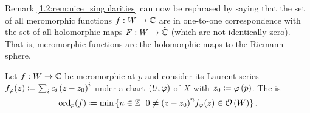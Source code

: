 \documentclass[../Moduli_Spaces_of_Riemann_Surfaces.tex]{subfiles}
\begin{document}
    \begin{remark}
        Remark \ref{1.2:rem:nice_singularities} can now be rephrased by saying that the set of all meromorphic functions $f:W\to\mathbb{C}$ are in one-to-one correspondence with the set of all holomorphic maps $F:W\to\hat{\mathbb{C}}$ (which are not identically zero). That is, meromorphic functions are the holomorphic maps to the Riemann sphere.\exqed
    \end{remark}
    \begin{definition}\label{1.2:def:order}
        Let $f:W\to\mathbb{C}$ be meromorphic at $p$ and consider its Laurent series $f_\varphi\!\left(z\right)\coloneqq\sum_{i}c_i\left(z-z_0\right)^i$ under a chart $\left(U,\varphi\right)$ of $X$ with $z_0\coloneqq\varphi\left(p\right)$. The  is
        \begin{equation*}
            \operatorname{ord}_p\!\left(f\right)\coloneqq\operatorname{min}\left\{n\in\mathbb{Z}\,\middle\vert\,0\neq\left(z-z_0\right)^n\!f_\varphi\!\left(z\right)\in\mathcal{O}\left(W\right)\right\}.
        \end{equation*}
    \end{definition}
    \vspace{-0.05in}
\end{document}
